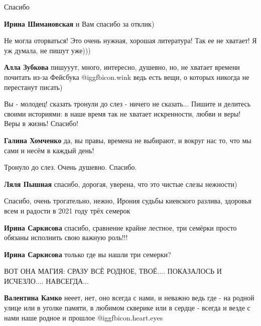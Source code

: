 \begin{itemize}
Спасибо

\textbf{Ирина Шимановская} и Вам спасибо за отклик)

Не могла оторваться! Это очень нужная, хорошая литература! Так ее не хватает! Я уж думала, не пишут уже)))

\begin{itemize} %
\textbf{Алла Зубкова} пишууут, много, интересно, душевно, но, не хватает времени почитать из-за Фейсбука @igg{fbicon.wink}  ведь есть вещи, о которых никогда не перестанут писать)
\end{itemize} %


Вы - молодец! сказать тронули до слез - ничего не сказать... Пишите и делитесь
своими историями: в наше время так не хватает искренности, любви и веры! Веры в
жизнь! Спасибо!

\begin{itemize} %
\textbf{Галина Хомченко} да, вы правы, времена не выбирают, и вокруг нас то, что мы сами и несём в каждый день!
\end{itemize} %

Тронуло до слез. Очень душевно. Спасибо.

\textbf{Ляля Пышная} спасибо, дорогая, уверена, что это чистые слезы нежности)

Спасибо, очень трогательно, нежно, Ирония судьбы киевского разлива, здоровья всем и радости в 2021 году трёх семерок

\begin{itemize} %
\textbf{Ирина Саркисова} спасибо, сравнение крайне лестное, три семёрки просто обязаны исполнить свою важную роль!!!

\textbf{Ирина Саркисова} только где вы нашли три семерки?
\end{itemize} %

ВОТ ОНА МАГИЯ: СРАЗУ ВСЁ РОДНОЕ, ТВОЁ.... ПОКАЗАЛОСЬ И ИСЧЕЗЛО.... НАВСЕГДА...

\begin{itemize} %
\textbf{Валентина Камко} нееет, нет, оно всегда с нами, и неважно ведь где - на родной улице или в уголке памяти, в любимом скверике или в сердце - всегда и везде с нами наше родное и прошлое @igg{fbicon.heart.eyes} 
\end{itemize} %


\end{itemize}
